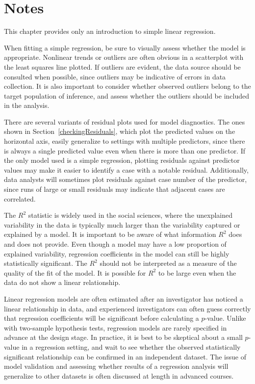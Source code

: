 \section{Notes}
\label{chSimpleLinearRegNotes}

This chapter provides only an introduction to simple linear regression.%

When fitting a simple regression, be sure to visually assess whether the model is appropriate. Nonlinear trends or outliers are often obvious in a scatterplot with the least squares line plotted. If outliers are evident, the data source should be consulted when possible, since outliers may be indicative of errors in data collection. It is also important to consider whether observed outliers belong to the target population of inference, and assess whether the outliers should be included in the analysis.

There are several variants of residual plots used for model diagnostics. The ones shown in Section~\ref{checkingResiduals}, which plot the predicted values on the horizontal axis, easily generalize to settings with multiple predictors, since there is always a single predicted value even when there is more than one predictor. If the only model used is a simple regression, plotting residuals against predictor values may make it easier to identify a case with a notable residual. Additionally, data analysts will sometimes plot residuals against case number of the predictor, since runs of large or small residuals may indicate that adjacent cases are correlated.

The $R^2$ statistic is widely used in the social sciences, where the unexplained variability in the data is typically much larger than the variability captured or explained by a model. It is important to be aware of what information $R^2$ does and does not provide. Even though a model may have a low proportion of explained variability, regression coefficients in the model can still be highly statistically significant. The $R^2$ should not be interpreted as a measure of the quality of the fit of the model. It is possible for $R^2$ to be large even when the data do not show a linear relationship. 

Linear regression models are often estimated after an investigator has noticed a linear relationship in data, and experienced investigators can often guess correctly that regression coefficients will be significant before calculating a $p$-value. Unlike with two-sample hypothesis tests, regression models are rarely specified in advance at the design stage. In practice, it is best to be skeptical about a small $p$-value in a regression setting, and wait to see whether the observed statistically significant relationship can be confirmed in an independent dataset. The issue of model validation and assessing whether results of a regression analysis will generalize to other datasets is often discussed at length in advanced courses.

